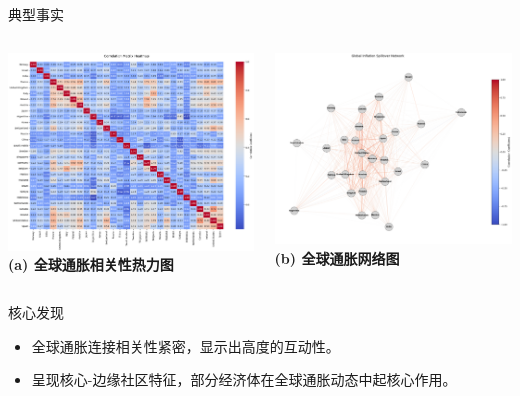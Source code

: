 \documentclass{beamer}
\begin{document}
\begin{frame}{典型事实}
  \centering
  \begin{columns}
    \centering
    \includegraphics[width=\linewidth]{fig/Inflation_CorrelationHeatmap.png}
    \textbf{(a) 全球通胀相关性热力图}
    
    \centering
    \includegraphics[width=\linewidth]{fig/Inflation_NetworkGraph.png}
    \textbf{(b) 全球通胀网络图}
  \end{columns}

  \vspace{0.1cm} %

  \begin{block}{核心发现}
    \begin{itemize}
      \item 全球通胀连接相关性紧密，显示出高度的互动性。
      \item 呈现核心-边缘社区特征，部分经济体在全球通胀动态中起核心作用。
    \end{itemize}
  \end{block}
\end{frame}
\end{document}
